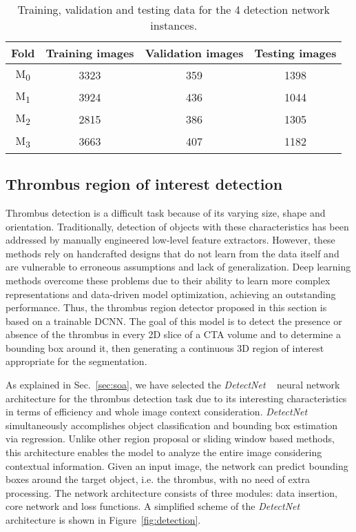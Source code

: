 \documentclass[preprint,authoryear,12pt]{elsarticle}
\begin{document}
\begin{table}[htb]
\centering
\begin{tabular}{c|c|c|c}
\hline
Fold & Training images & Validation images & Testing images \\
\hline
M\textsubscript{0} & 3323 & 359 & 1398  \\
M\textsubscript{1} & 3924 & 436 & 1044  \\
M\textsubscript{2} & 2815 & 386 & 1305  \\
M\textsubscript{3} & 3663 & 407 & 1182
\end{tabular}
\caption{\label{tab:dataDetect}Training, validation and testing data for the 4 detection network instances.}
\end{table}


\subsection{Thrombus region of interest detection}
Thrombus detection is a difficult task because of its varying size, shape and orientation. Traditionally, detection of objects with these characteristics has been addressed by manually engineered low-level feature extractors. However, these methods rely on handcrafted designs that do not learn from the data itself and are vulnerable to erroneous assumptions and lack of generalization. Deep learning methods overcome these problems due to their ability to learn more complex representations and data-driven model optimization, achieving an outstanding performance. Thus, the thrombus region detector proposed in this section is based on a trainable DCNN. The goal of this model is to detect the presence or absence of the thrombus in every 2D slice of a CTA volume and to determine a bounding box around it, then generating a continuous 3D region of interest appropriate for the segmentation.

As explained in Sec.~\ref{sec:soa}, we have selected the \textit{DetectNet} ~\citep{Detectnet} neural network architecture for the thrombus detection task due to its interesting characteristics in terms of efficiency and whole image context consideration. \textit{DetectNet} simultaneously accomplishes object classification and bounding box estimation via regression. Unlike other region proposal or sliding window based methods, this architecture enables the model to analyze the entire image considering contextual information. Given an input image, the network can predict bounding boxes around the target object, i.e. the thrombus, with no need of extra processing. The network architecture consists of three modules: data insertion, core network and loss functions. A simplified scheme of the \textit{DetectNet} architecture is shown in Figure~\ref{fig:detection}.
\end{document}
